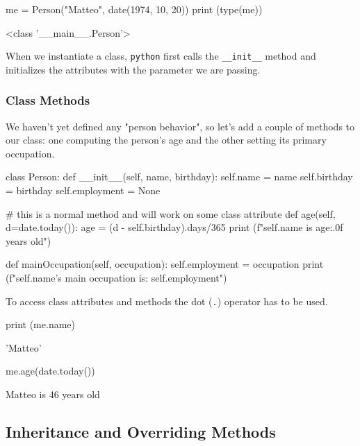 \begin{ipython}
me = Person("Matteo", date(1974, 10, 20))
print (type(me))
\end{ipython}
\begin{ioutput}
<class '\_\_main\_\_.Person'>
\end{ioutput}

When we instantiate a class, \texttt{python} first calls the \texttt{\_\_init\_\_} method and initializes the attributes with the parameter we are passing.

\subsubsection{Class Methods}

We haven't yet defined any "person behavior", so let's add a couple of methods to our class: one computing the person's age and the other setting its primary occupation.

\begin{ipython}
class Person:
    def __init__(self, name, birthday):
        self.name = name
        self.birthday = birthday
        self.employment = None

    # this is a normal method and will work on some class attribute
    def age(self, d=date.today()):
        age = (d - self.birthday).days/365
        print (f"{self.name} is {age:.0f} years old")

    def mainOccupation(self, occupation):
        self.employment = occupation
        print (f"{self.name}'s main occupation is: {self.employment}")
\end{ipython}

To access class attributes and methods the dot (\texttt{.}) operator has to be used. 

\begin{ipython}
print (me.name)
\end{ipython}
\begin{ioutput}
'Matteo'
\end{ioutput}
        
\begin{ipython}
me.age(date.today())
\end{ipython}
\begin{ioutput}
Matteo is 46 years old
\end{ioutput}

\subsection{Inheritance and Overriding Methods}
\label{inheritance-and-overriding-methods}

